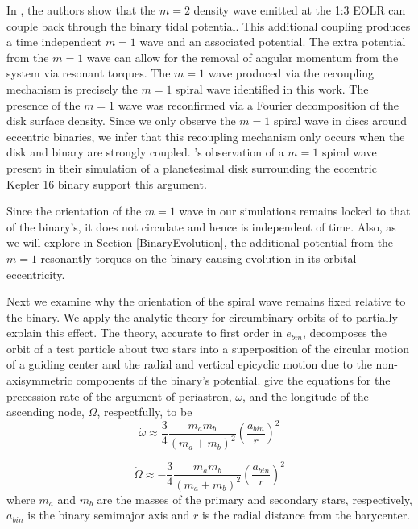 In \citet{Papaloizou01}, the authors show that the $m=2$ density wave
emitted at the 1:3 EOLR can couple back through the binary tidal potential. This additional coupling produces a time independent $m = 1$ wave and an associated potential.  The extra potential from the $m = 1$ wave can allow for the removal of angular momentum from the system via resonant torques.  The $m = 1$ wave produced via the recoupling mechanism is precisely the $m = 1$ spiral wave identified in this work.  The presence of the $m = 1$ wave was reconfirmed via a Fourier decomposition of the disk surface density.  Since we only observe the $m = 1$ spiral wave in discs around eccentric binaries, we infer that this recoupling mechanism only occurs when the disk and binary are strongly coupled.  \citet{Lines16}'s observation of a $m = 1$ spiral wave present in their simulation of a planetesimal disk surrounding the eccentric Kepler 16 binary support this argument.

Since the orientation of the $m = 1$ wave in our simulations remains locked to that of the binary's, it does not circulate and hence is independent of time.  Also, as we will explore in Section \ref{BinaryEvolution}, the additional potential from the $m = 1$ resonantly torques on the binary causing evolution in its orbital eccentricity.  

Next we examine why the orientation of the spiral wave remains fixed relative to the binary.  We apply the analytic theory for circumbinary orbits of \citet{Leung2013} to partially explain this effect.  The theory, accurate to first order in $e_{bin}$, decomposes the orbit of a test particle about two stars into a superposition of the circular motion of a guiding center and the radial and vertical epicyclic motion due to the non-axisymmetric components of the binary's potential.  \citet{Leung2013} give the equations for the precession rate of the argument of periastron, $\omega$, and the longitude of the ascending node, $\Omega$, respectfully, to be
\begin{equation}
\label{eqn:Periastron}
\dot{\omega} \approx \frac{3}{4} \frac{m_a m_b}{(m_a + m_b)^2} \left( \frac{a_{bin}}{r} \right)^2
\end{equation}

\begin{equation}
\label{eqn:Longitude}
\dot{\Omega} \approx -\frac{3}{4} \frac{m_a m_b}{(m_a + m_b)^2} \left( \frac{a_{bin}}{r} \right)^2
\end{equation}
where $m_a$ and $m_b$ are the masses of the primary and secondary stars, respectively, $a_{bin}$ is the binary semimajor
axis and $r$ is the radial distance from the barycenter. 

